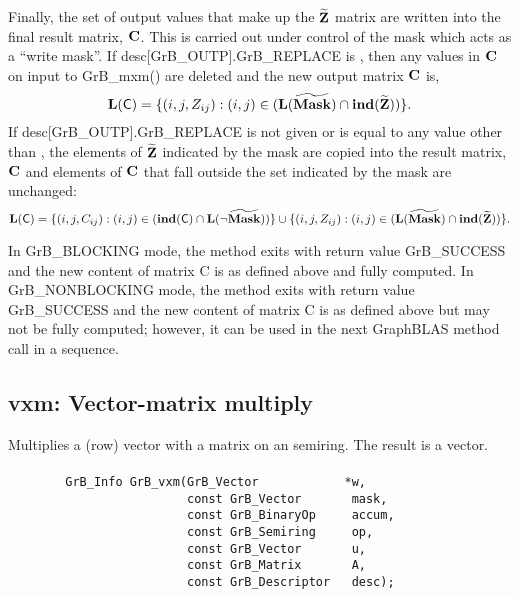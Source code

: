 Finally, the set of output values that make up the ${\bf \widetilde{Z}}$ matrix are written into the final result matrix, ${\bf C}$. 
This is carried out under control of the mask which acts as a ``write mask''.
If {\sf desc[GrB\_OUTP].GrB\_REPLACE} is \true, then any values in ${\bf C}$ on input to {\sf GrB\_mxm()} are deleted and the new
output matrix ${\bf C}$ is,
\[ \bold{L}({\sf C}) = \{(i,j,Z_{ij}) : (i,j) \in (\bold{L}({\bf \widetilde{Mask}}) \cap \bold{ind}({\bf \widetilde{Z}})) \}. \]
If {\sf desc[GrB\_OUTP].GrB\_REPLACE} is not given or is equal to any value other than \true, the elements of ${\bf \widetilde{Z}}$ indicated by the mask
are copied into the result matrix, ${\bf C}$ and elements of ${\bf C}$  that fall outside the set indicated by the mask are unchanged:
\[ \bold{L}({\sf C}) = \{(i,j,C_{ij}) : (i,j) \in (\bold{ind}({\bf \sf C}) \cap \bold{L}(\neg {\bf \widetilde{Mask}})) \} \cup \{(i,j,Z_{ij}) : (i,j) \in (\bold{L}({\bf \widetilde{Mask}}) \cap \bold{ind}({\bf \widetilde{Z}})) \}. \]

In {\sf GrB\_BLOCKING} mode, the method exits with return value {\sf GrB\_SUCCESS} and the new content of matrix {\sf C} is as defined above and fully computed.
In {\sf GrB\_NONBLOCKING} mode, the method exits with return value {\sf GrB\_SUCCESS} and the new content of matrix {\sf C} is as defined above but may not be fully computed; however, it can be used in the next GraphBLAS 
method call in a sequence.


\subsection{{\sf vxm}: Vector-matrix multiply}

Multiplies a (row) vector with a matrix on an semiring. The result is a vector.

\paragraph{\syntax}

\begin{verbatim}
        GrB_Info GrB_vxm(GrB_Vector            *w,
                         const GrB_Vector       mask,
                         const GrB_BinaryOp     accum,
                         const GrB_Semiring     op,
                         const GrB_Vector       u, 
                         const GrB_Matrix       A,
                         const GrB_Descriptor   desc);
\end{verbatim}

